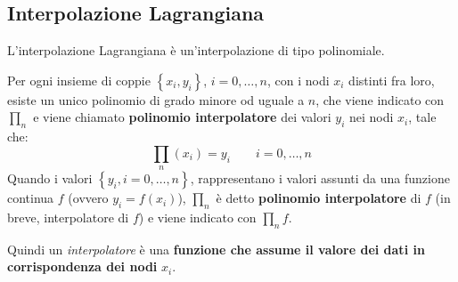 \subsection{Interpolazione Lagrangiana}

L'interpolazione Lagrangiana è un'interpolazione di tipo polinomiale.

\begin{definitionbox}
	Per ogni insieme di coppie $\left\{x_{i}, y_{i}\right\}$, $i = 0, \dots, n$, con i nodi $x_{i}$ distinti fra loro, esiste un unico polinomio di grado minore od uguale a $n$, che viene indicato con $\prod_{n}$ e viene chiamato \textbf{polinomio interpolatore} dei valori $y_{i}$ nei nodi $x_{i}$, tale che:
	\begin{equation}\label{eq: quantificazione dell'errore - interpolazione Lagrangiana}
		\displaystyle\prod_{n}\left(x_{i}\right) = y_{i} \hspace{2em} i = 0, \dots, n
	\end{equation}
	Quando i valori $\left\{y_{i}, i = 0, \dots, n\right\}$, rappresentano i valori assunti da una funzione continua $f$ (ovvero $y_{i} = f\left(x_{i}\right)$), $\prod_{n}$ è detto \textbf{polinomio interpolatore} di $f$ (in breve, interpolatore di $f$) e viene indicato con $\prod_{n}f$.
\end{definitionbox}

\noindent
Quindi un \emph{interpolatore} è una \textbf{funzione che assume il valore dei dati in corrispondenza dei nodi} $x_{i}$.

